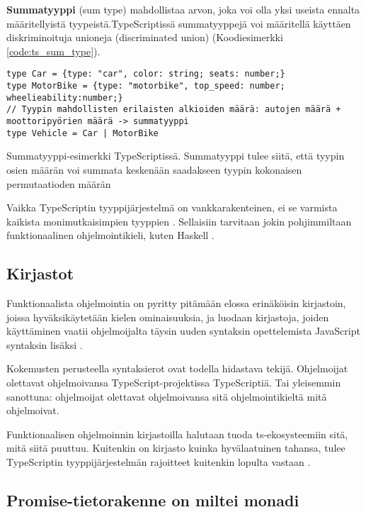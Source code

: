 \textbf{Summatyyppi} (sum type) mahdollistaa arvon, joka voi olla yksi useista ennalta määritellyistä tyypeistä.TypeScriptissä summatyyppejä voi määritellä käyttäen diskriminoituja unioneja (discriminated union) (Koodiesimerkki \ref{code:ts_sum_type}). \citep{algebraic_data_types,holvikari2021category}

\begin{code}
    \begin{verbatim}
type Car = {type: "car", color: string; seats: number;}
type MotorBike = {type: "motorbike", top_speed: number; wheelieability:number;}
// Tyypin mahdollisten erilaisten alkioiden määrä: autojen määrä + moottoripyörien määrä -> summatyyppi
type Vehicle = Car | MotorBike
\end{verbatim}
    \caption{Summatyyppi-esimerkki TypeScriptissä. Summatyyppi tulee siitä, että tyypin osien määrän voi summata keskenään saadakseen tyypin kokonaisen permutaatioden määrän}
    \label{code:ts_sum_type}
\end{code}


Vaikka TypeScriptin tyyppijärjestelmä on vankkarakenteinen, ei se varmista kaikista monimutkaisimpien tyyppien . Sellaisiin tarvitaan jokin pohjimmiltaan funktionaalinen ohjelmointikieli, kuten Haskell \cite{holvikari2021category}.

\subsection{Kirjastot}

Funktionaalista ohjelmointia on pyritty pitämään elossa erinäköisin kirjastoin, joissa hyväksikäytetään kielen ominaisuuksia, ja luodaan kirjastoja, joiden käyttäminen vaatii ohjelmoijalta täysin uuden syntaksin opettelemista JavaScript syntaksin lisäksi \cite{ramda,sanctuary,crocks,fpts}.

Kokemusten perusteella syntaksierot ovat todella hidastava tekijä. Ohjelmoijat olettavat ohjelmoivansa TypeScript-projektissa TypeScriptiä. Tai yleisemmin sanottuna: ohjelmoijat olettavat ohjelmoivansa sitä ohjelmointikieltä mitä ohjelmoivat.

Funktionaalisen ohjelmoinnin kirjastoilla halutaan tuoda \gls{ts}-ekosysteemiin sitä, mitä siitä puuttuu. Kuitenkin on kirjasto kuinka hyvälaatuinen tahansa, tulee TypeScriptin tyyppijärjestelmän rajoitteet kuitenkin lopulta vastaan \cite{holvikari2021category}.

\subsection{Promise-tietorakenne on miltei monadi}

